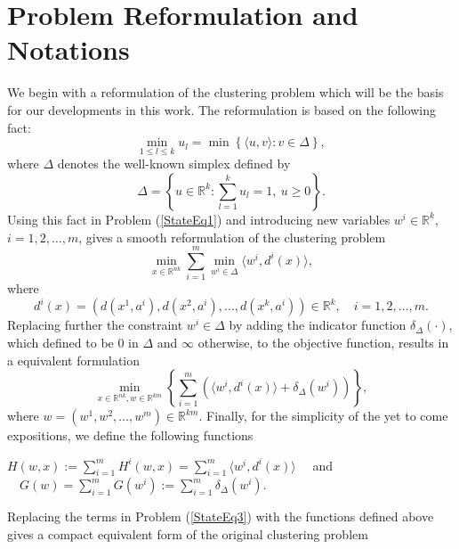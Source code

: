 \documentclass[11pt]{article}
\numberwithin{equation}{section}
\begin{document}
\section{Problem Reformulation and Notations}

We begin with a reformulation of the clustering problem which will be the basis for our developments in this work. The reformulation is based on the following fact:
\begin{equation*}
	\min\limits_{1 \leq l \leq k} u_l = \min \left\lbrace \langle u,v \rangle : v \in \Delta \right\rbrace ,
\end{equation*}
where $\Delta$ denotes the well-known simplex defined by
\begin{equation*}
	\Delta = \left\lbrace u \in \mathbb{R}^k : \sum\limits_{l=1}^{k} u_l = 1, \: u \geq 0 \right\rbrace .
\end{equation*}
Using this fact in Problem (\ref{StateEq1}) and introducing new variables $w^i \in \mathbb{R}^k$, $i=1,2, \ldots, m$, gives a smooth reformulation of the clustering problem
\begin{equation}
	\min\limits_{x \in \mathbb{R}^{nk}} \sum\limits_{i=1}^{m} \min\limits_{w^i \in \Delta} \langle w^i , d^i(x) \rangle , \label{StateEq2}
\end{equation}
where 
\begin{equation*}
d^{i}(x) = (d(x^1,a^i), d(x^2,a^i), \ldots , d(x^k,a^i)) \in \mathbb{R}^k, \quad i=1, 2, \ldots , m.
\end{equation*}
Replacing further the constraint $w^i \in \Delta$ by adding the indicator function $\delta_{\Delta}(\cdot)$, which defined to be $0$ in $\Delta$ and $\infty$ otherwise, to the objective function, results in a equivalent formulation
\begin{equation}
	\min\limits_{x \in \mathbb{R}^{nk} , w \in \mathbb{R}^{km}} \left\lbrace \sum\limits_{i=1}^{m} \left( \langle w^i , d^i(x) \rangle + \delta_{\Delta}(w^i) \right) \right\rbrace , \label{StateEq3}
\end{equation}
where $w = (w^1, w^2, \ldots , w^m) \in \mathbb{R}^{km}$.
Finally, for the simplicity of the yet to come expositions, we define the following functions
\begin{center}
$H(w,x) := \sum\limits_{i=1}^{m} H^i(w,x) = \sum\limits_{i=1}^{m} \langle w^i , d^i(x) \rangle \quad$ and $\quad G(w) = \sum\limits_{i=1}^{m} G(w^i) := \sum\limits_{i=1}^{m} \delta_{\Delta}(w^i) .$
\end{center}

Replacing the terms in Problem (\ref{StateEq3}) with the functions defined above gives a compact equivalent form of the original clustering problem
\end{document}
